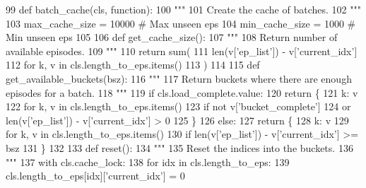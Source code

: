 \begin{DoxyCode}
99     \textcolor{keyword}{def }batch\_cache(cls, function):
100         \textcolor{stringliteral}{"""}
101 \textcolor{stringliteral}{        Create the cache of batches.}
102 \textcolor{stringliteral}{        """}
103         max\_cache\_size = 10000  \textcolor{comment}{# Max unseen eps}
104         min\_cache\_size = 1000  \textcolor{comment}{# Min unseen eps}
105 
106         \textcolor{keyword}{def }get\_cache\_size():
107             \textcolor{stringliteral}{"""}
108 \textcolor{stringliteral}{            Return number of available episodes.}
109 \textcolor{stringliteral}{            """}
110             \textcolor{keywordflow}{return} sum(
111                 len(v[\textcolor{stringliteral}{'ep\_list'}]) - v[\textcolor{stringliteral}{'current\_idx'}]
112                 \textcolor{keywordflow}{for} k, v \textcolor{keywordflow}{in} cls.length\_to\_eps.items()
113             )
114 
115         \textcolor{keyword}{def }get\_available\_buckets(bsz):
116             \textcolor{stringliteral}{"""}
117 \textcolor{stringliteral}{            Return buckets where there are enough episodes for a batch.}
118 \textcolor{stringliteral}{            """}
119             \textcolor{keywordflow}{if} cls.load\_complete.value:
120                 \textcolor{keywordflow}{return} \{
121                     k: v
122                     \textcolor{keywordflow}{for} k, v \textcolor{keywordflow}{in} cls.length\_to\_eps.items()
123                     \textcolor{keywordflow}{if} \textcolor{keywordflow}{not} v[\textcolor{stringliteral}{'bucket\_complete'}]
124                     \textcolor{keywordflow}{or} len(v[\textcolor{stringliteral}{'ep\_list'}]) - v[\textcolor{stringliteral}{'current\_idx'}] > 0
125                 \}
126             \textcolor{keywordflow}{else}:
127                 \textcolor{keywordflow}{return} \{
128                     k: v
129                     \textcolor{keywordflow}{for} k, v \textcolor{keywordflow}{in} cls.length\_to\_eps.items()
130                     \textcolor{keywordflow}{if} len(v[\textcolor{stringliteral}{'ep\_list'}]) - v[\textcolor{stringliteral}{'current\_idx'}] >= bsz
131                 \}
132 
133         \textcolor{keyword}{def }reset():
134             \textcolor{stringliteral}{"""}
135 \textcolor{stringliteral}{            Reset the indices into the buckets.}
136 \textcolor{stringliteral}{            """}
137             with cls.cache\_lock:
138                 \textcolor{keywordflow}{for} idx \textcolor{keywordflow}{in} cls.length\_to\_eps:
139                     cls.length\_to\_eps[idx][\textcolor{stringliteral}{'current\_idx'}] = 0

\end{DoxyCode}
